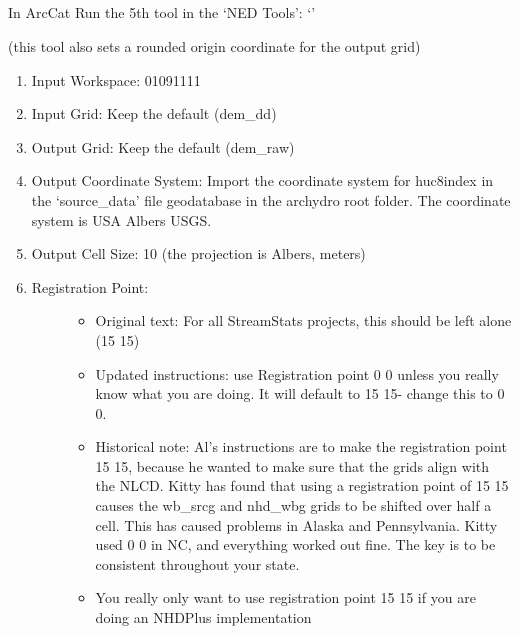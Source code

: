 \documentclass[letterpaper,10pt,english]{sphinxmanual}
\begin{document}
\subparagraph{}
\label{\detokenize{ex_1:step-2e-project-and-scale-ned}}
In ArcCat Run the 5th tool in the ‘NED Tools’: ‘’

(this tool also sets a rounded origin coordinate for the output grid)
\begin{enumerate}
\def\theenumi{\arabic{enumi}}
\def\labelenumi{\theenumi .}
\makeatletter\def\p@enumii{\p@enumi \theenumi .}\makeatother
\item {} 
Input Workspace: 01091111

\item {} 
Input Grid: Keep the default (dem\_dd)

\item {} 
Output Grid: Keep the default (dem\_raw)

\item {} 
Output Coordinate System: Import the coordinate system for huc8index in the ‘source\_data’ file geodatabase in the archydro root folder.  The coordinate system is USA Albers USGS.

\item {} 
Output Cell Size: 10 (the projection is Albers, meters)

\item {} \begin{description}
\item[{Registration Point:}] \leavevmode\begin{itemize}
\item {} 
Original text: For all StreamStats projects, this should be left alone (15 15)

\item {} 
Updated instructions: use Registration point 0 0 unless you really know what you are doing. It will default to 15 15- change this to 0 0.

\item {} 
Historical note: Al’s instructions are to make the registration point 15 15, because he wanted to make sure that the grids align with the NLCD. Kitty has found that using a registration point of 15 15 causes the wb\_srcg and nhd\_wbg grids to be shifted over half a cell. This has caused problems in Alaska and Pennsylvania. Kitty used 0 0 in NC, and everything worked out fine. The key is to be consistent throughout your state.

\item {} 
You really only want to use registration point 15 15 if you are doing an NHDPlus implementation

\end{itemize}

\end{description}

\end{enumerate}
\end{document}
